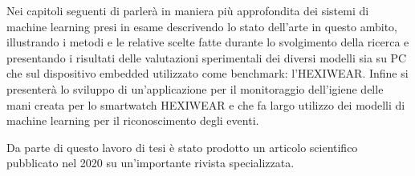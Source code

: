 Nei capitoli seguenti di parlerà in maniera più approfondita dei sistemi di machine learning presi in esame descrivendo lo stato dell'arte in questo ambito, illustrando i metodi e le relative scelte fatte durante lo svolgimento della ricerca e presentando i risultati delle valutazioni sperimentali dei diversi modelli sia su PC che sul dispositivo embedded utilizzato come benchmark: l'HEXIWEAR. Infine si presenterà lo sviluppo di un'applicazione per il monitoraggio dell'igiene delle mani creata per lo smartwatch HEXIWEAR e che fa largo utilizzo dei modelli di machine learning per il riconoscimento degli eventi.

Da parte di questo lavoro di tesi è stato prodotto un articolo scientifico pubblicato nel 2020 su un'importante rivista specializzata\cite{lattanzi2022unstructured}.
